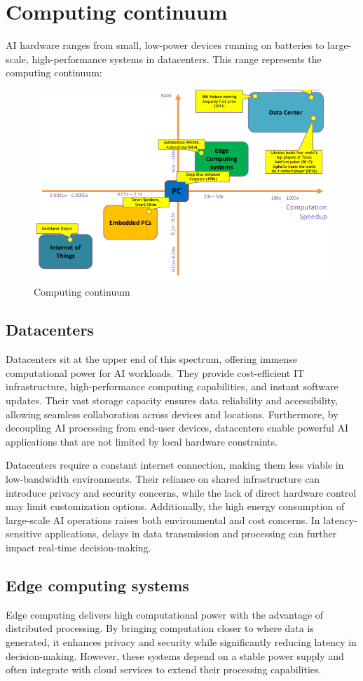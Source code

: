 \section{Computing continuum}

AI hardware ranges from small, low-power devices running on batteries to large-scale, high-performance systems in datacenters.
This range represents the computing continuum: 
\begin{figure}[H]
    \centering
    \includegraphics[width=0.5\linewidth]{images/eeai2.png}
    \caption{Computing continuum}
\end{figure}

\subsection{Datacenters}
Datacenters sit at the upper end of this spectrum, offering immense computational power for AI workloads.
They provide cost-efficient IT infrastructure, high-performance computing capabilities, and instant software updates.
Their vast storage capacity ensures data reliability and accessibility, allowing seamless collaboration across devices and locations. 
Furthermore, by decoupling AI processing from end-user devices, datacenters enable powerful AI applications that are not limited by local hardware constraints.

Datacenters require a constant internet connection, making them less viable in low-bandwidth environments. 
Their reliance on shared infrastructure can introduce privacy and security concerns, while the lack of direct hardware control may limit customization options. 
Additionally, the high energy consumption of large-scale AI operations raises both environmental and cost concerns. 
In latency-sensitive applications, delays in data transmission and processing can further impact real-time decision-making.

\subsection{Edge computing systems}
Edge computing delivers high computational power with the advantage of distributed processing. 
By bringing computation closer to where data is generated, it enhances privacy and security while significantly reducing latency in decision-making. 
However, these systems depend on a stable power supply and often integrate with cloud services to extend their processing capabilities.

